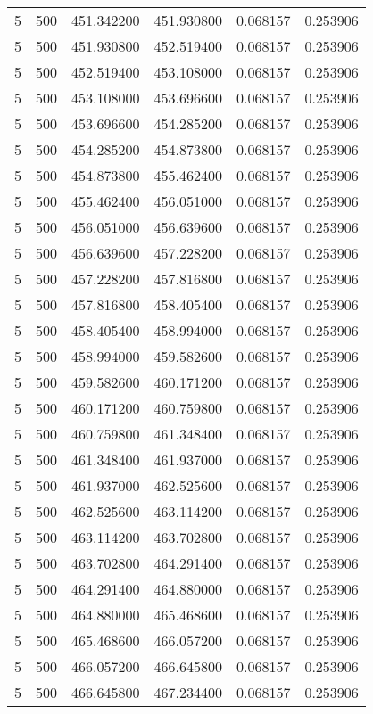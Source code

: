 \begin{longtable}{rrrrrr}
5 & 500 & 451.342200 & 451.930800 & 0.068157 & 0.253906 \\
5 & 500 & 451.930800 & 452.519400 & 0.068157 & 0.253906 \\
5 & 500 & 452.519400 & 453.108000 & 0.068157 & 0.253906 \\
5 & 500 & 453.108000 & 453.696600 & 0.068157 & 0.253906 \\
5 & 500 & 453.696600 & 454.285200 & 0.068157 & 0.253906 \\
5 & 500 & 454.285200 & 454.873800 & 0.068157 & 0.253906 \\
5 & 500 & 454.873800 & 455.462400 & 0.068157 & 0.253906 \\
5 & 500 & 455.462400 & 456.051000 & 0.068157 & 0.253906 \\
5 & 500 & 456.051000 & 456.639600 & 0.068157 & 0.253906 \\
5 & 500 & 456.639600 & 457.228200 & 0.068157 & 0.253906 \\
5 & 500 & 457.228200 & 457.816800 & 0.068157 & 0.253906 \\
5 & 500 & 457.816800 & 458.405400 & 0.068157 & 0.253906 \\
5 & 500 & 458.405400 & 458.994000 & 0.068157 & 0.253906 \\
5 & 500 & 458.994000 & 459.582600 & 0.068157 & 0.253906 \\
5 & 500 & 459.582600 & 460.171200 & 0.068157 & 0.253906 \\
5 & 500 & 460.171200 & 460.759800 & 0.068157 & 0.253906 \\
5 & 500 & 460.759800 & 461.348400 & 0.068157 & 0.253906 \\
5 & 500 & 461.348400 & 461.937000 & 0.068157 & 0.253906 \\
5 & 500 & 461.937000 & 462.525600 & 0.068157 & 0.253906 \\
5 & 500 & 462.525600 & 463.114200 & 0.068157 & 0.253906 \\
5 & 500 & 463.114200 & 463.702800 & 0.068157 & 0.253906 \\
5 & 500 & 463.702800 & 464.291400 & 0.068157 & 0.253906 \\
5 & 500 & 464.291400 & 464.880000 & 0.068157 & 0.253906 \\
5 & 500 & 464.880000 & 465.468600 & 0.068157 & 0.253906 \\
5 & 500 & 465.468600 & 466.057200 & 0.068157 & 0.253906 \\
5 & 500 & 466.057200 & 466.645800 & 0.068157 & 0.253906 \\
5 & 500 & 466.645800 & 467.234400 & 0.068157 & 0.253906 \\

\end{longtable}
